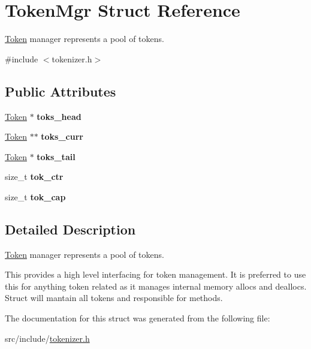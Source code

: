 \hypertarget{struct_token_mgr}{}\section{Token\+Mgr Struct Reference}
\label{struct_token_mgr}


\mbox{\hyperlink{struct_token}{Token}} manager represents a pool of tokens.  




{\ttfamily \#include $<$tokenizer.\+h$>$}

\subsection*{Public Attributes}
\begin{DoxyCompactItemize}
\item 
\mbox{\label{struct_token_mgr_aee9bee2443af37eae9fa475620873646}} 
\mbox{\hyperlink{struct_token}{Token}} $\ast$ {\bfseries toks\+\_\+head}
\item 
\mbox{\label{struct_token_mgr_a3d36fd3a48a52dbd497fa83eea77bbb8}} 
\mbox{\hyperlink{struct_token}{Token}} $\ast$$\ast$ {\bfseries toks\+\_\+curr}
\item 
\mbox{\label{struct_token_mgr_ad9416707c973324743b48586e20c7bee}} 
\mbox{\hyperlink{struct_token}{Token}} $\ast$ {\bfseries toks\+\_\+tail}
\item 
\mbox{\label{struct_token_mgr_a764c0f04ff55f5e23b727b1c7de8003e}} 
size\+\_\+t {\bfseries tok\+\_\+ctr}
\item 
\mbox{\label{struct_token_mgr_a6c51c54b6a2a05ad7f54a6e33c63e5fb}} 
size\+\_\+t {\bfseries tok\+\_\+cap}
\end{DoxyCompactItemize}


\subsection{Detailed Description}
\mbox{\hyperlink{struct_token}{Token}} manager represents a pool of tokens. 

This provides a high level interfacing for token management. It is preferred to use this for anything token related as it manages internal memory allocs and deallocs. Struct will mantain all tokens and responsible for methods. 

The documentation for this struct was generated from the following file\+:\begin{DoxyCompactItemize}
\item 
src/include/\mbox{\hyperlink{tokenizer_8h}{tokenizer.\+h}}\end{DoxyCompactItemize}
